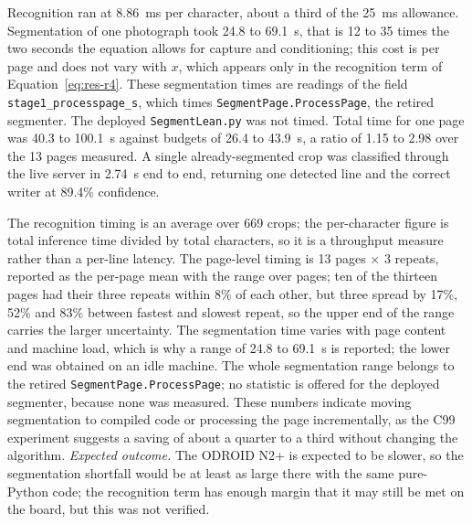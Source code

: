 
            Recognition ran at 8.86~ms per character, about a third of the 25~ms allowance.
            Segmentation of one photograph took 24.8 to 69.1~s, that is 12 to 35 times the two seconds the equation allows for capture and conditioning; this cost is per page and does not vary with $x$, which appears only in the recognition term of Equation~\ref{eq:res-r4}.
            These segmentation times are readings of the field \texttt{stage1\_processpage\_s}, which times \texttt{SegmentPage.ProcessPage}, the retired segmenter. The deployed \texttt{SegmentLean.py} was not timed.
            Total time for one page was 40.3 to 100.1~s against budgets of 26.4 to 43.9~s, a ratio of 1.15 to 2.98 over the 13 pages measured.
            A single already-segmented crop was classified through the live server in 2.74~s end to end, returning one detected line and the correct writer at 89.4\% confidence.


            The recognition timing is an average over 669 crops; the per-character figure is total inference time divided by total characters, so it is a throughput measure rather than a per-line latency.
            The page-level timing is 13 pages $\times$ 3 repeats, reported as the per-page mean with the range over pages; ten of the thirteen pages had their three repeats within 8\% of each other, but three spread by 17\%, 52\% and 83\% between fastest and slowest repeat, so the upper end of the range carries the larger uncertainty.
            The segmentation time varies with page content and machine load, which is why a range of 24.8 to 69.1~s is reported; the lower end was obtained on an idle machine.
            The whole segmentation range belongs to the retired \texttt{SegmentPage.ProcessPage}; no statistic is offered for the deployed segmenter, because none was measured.
            These numbers indicate moving segmentation to compiled code or processing the page incrementally, as the C99 experiment suggests a saving of about a quarter to a third without changing the algorithm.
            \emph{Expected outcome.}
            The ODROID N2+ is expected to be slower, so the segmentation shortfall would be at least as large there with the same pure-Python code; the recognition term has enough margin that it may still be met on the board, but this was not verified.


